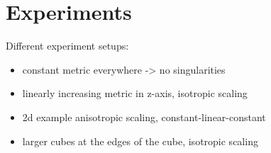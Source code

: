 \documentclass[../thesis.tex]{subfiles}
\begin{document}
\chapter{Experiments}
\label{ch:experiments}

Different experiment setups:
\begin{itemize}
    \item constant metric everywhere -> no singularities
    \item linearly increasing metric in z-axis, isotropic scaling
    \item 2d example anisotropic scaling, constant-linear-constant
    \item larger cubes at the edges of the cube, isotropic scaling
\end{itemize}
\end{document}
